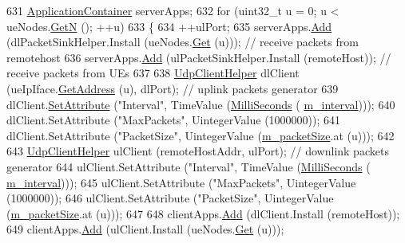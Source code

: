 \begin{DoxyCode}
631   \hyperlink{classns3_1_1ApplicationContainer}{ApplicationContainer} serverApps;
632   \textcolor{keywordflow}{for} (uint32\_t u = 0; u < ueNodes.\hyperlink{classns3_1_1NodeContainer_aed647ac56d0407a7706aba02eb44b951}{GetN} (); ++u)
633     \{
634       ++ulPort;
635       serverApps.\hyperlink{classns3_1_1ApplicationContainer_ad09ab1a1ad5849d518d5f4c262e38152}{Add} (dlPacketSinkHelper.Install (ueNodes.\hyperlink{classns3_1_1NodeContainer_a9ed96e2ecc22e0f5a3d4842eb9bf90bf}{Get} (u))); \textcolor{comment}{// receive packets from
       remotehost}
636       serverApps.\hyperlink{classns3_1_1ApplicationContainer_ad09ab1a1ad5849d518d5f4c262e38152}{Add} (ulPacketSinkHelper.Install (remoteHost));  \textcolor{comment}{// receive packets from UEs}
637 
638       \hyperlink{classns3_1_1UdpClientHelper}{UdpClientHelper} dlClient (ueIpIface.\hyperlink{classns3_1_1Ipv4InterfaceContainer_ae63208dcd222be986822937ee4aa828c}{GetAddress} (u), dlPort); \textcolor{comment}{// uplink
       packets generator}
639       dlClient.\hyperlink{classns3_1_1UdpClientHelper_a8bbae16a28f85ab3f3b5aa4642edfeae}{SetAttribute} (\textcolor{stringliteral}{"Interval"}, TimeValue (\hyperlink{group__timecivil_gaf26127cf4571146b83a92ee18679c7a9}{MilliSeconds} (
      \hyperlink{classLenaCqaFfMacSchedulerTestCase2_a682a0b8a7dee755e81395b515b0643e4}{m\_interval})));
640       dlClient.SetAttribute (\textcolor{stringliteral}{"MaxPackets"}, UintegerValue (1000000));
641       dlClient.SetAttribute (\textcolor{stringliteral}{"PacketSize"}, UintegerValue (\hyperlink{classLenaCqaFfMacSchedulerTestCase2_ad46ead6ee3f29ac4d167b294e9fd7a7c}{m\_packetSize}.at (u)));
642 
643       \hyperlink{classns3_1_1UdpClientHelper}{UdpClientHelper} ulClient (remoteHostAddr, ulPort);           \textcolor{comment}{// downlink packets
       generator}
644       ulClient.SetAttribute (\textcolor{stringliteral}{"Interval"}, TimeValue (\hyperlink{group__timecivil_gaf26127cf4571146b83a92ee18679c7a9}{MilliSeconds} (
      \hyperlink{classLenaCqaFfMacSchedulerTestCase2_a682a0b8a7dee755e81395b515b0643e4}{m\_interval})));
645       ulClient.SetAttribute (\textcolor{stringliteral}{"MaxPackets"}, UintegerValue (1000000));
646       ulClient.SetAttribute (\textcolor{stringliteral}{"PacketSize"}, UintegerValue (\hyperlink{classLenaCqaFfMacSchedulerTestCase2_ad46ead6ee3f29ac4d167b294e9fd7a7c}{m\_packetSize}.at (u)));
647 
648       clientApps.\hyperlink{classns3_1_1ApplicationContainer_ad09ab1a1ad5849d518d5f4c262e38152}{Add} (dlClient.Install (remoteHost));
649       clientApps.\hyperlink{classns3_1_1ApplicationContainer_ad09ab1a1ad5849d518d5f4c262e38152}{Add} (ulClient.Install (ueNodes.\hyperlink{classns3_1_1NodeContainer_a9ed96e2ecc22e0f5a3d4842eb9bf90bf}{Get} (u)));

\end{DoxyCode}
